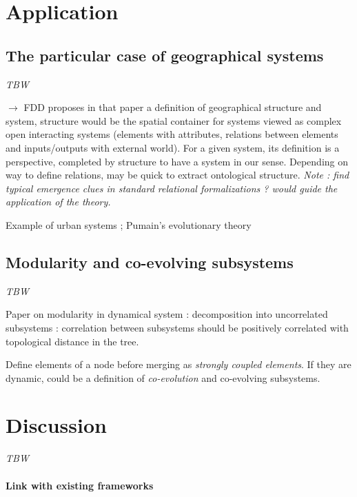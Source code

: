 \section*{Application}

\subsection*{The particular case of geographical systems}

\textit{TBW}

\cite{dollfus1975some} %
$\rightarrow$ FDD proposes in that paper a definition of geographical structure and system, structure would be the spatial container for systems viewed as complex open interacting systems (elements with attributes, relations between elements and inputs/outputs with external world). For a given system, its definition is a perspective, completed by structure to have a system in our sense. Depending on way to define relations, may be quick to extract ontological structure. \textit{Note : find typical emergence clues in standard relational formalizations ? would guide the application of the theory.}

Example of urban systems ; Pumain's evolutionary theory~\cite{pumain2010theorie}


\subsection*{Modularity and co-evolving subsystems}

\textit{TBW}

Paper on modularity in dynamical system : decomposition into uncorrelated subsystems : correlation between subsystems should be positively correlated with topological distance in the tree.

Define elements of a node before merging as \emph{strongly coupled elements}. If they are dynamic, could be a definition of \emph{co-evolution} and co-evolving subsystems.


\section*{Discussion}

\textit{TBW}

\paragraph{Link with existing frameworks}

